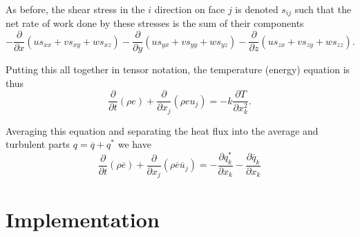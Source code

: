 As before, the shear stress in the $i$ direction on face $j$ is denoted $s_{ij}$ such that the net rate of work done by these stresses is the sum of their components
\begin{equation} - \frac{\partial }{\partial x} \left ( u s_{xx} + v s_{xy} + w s_{xz} \right) - \frac{\partial }{\partial y} \left (u s_{yx} + v s_{yy} + w s_{yz} \right) - \frac{\partial }{\partial z}\left (u s_{zx} + v s_{zy} + w s_{zz} \right) \label{eq:energy6}.\end{equation}

Putting this all together in tensor notation, the temperature (energy) equation is thus
\begin{equation} \frac{\partial }{\partial t} \left ( \rho e\right ) + \frac{\partial}{\partial x_j} \left ( \rho e u_j \right ) 
= 
-k \frac{\partial T}{\partial x_k^2}.
\end{equation}

Averaging this equation and separating the heat flux into the average and turbulent parts $q = \overline{q} + q^*$ we have
\begin{equation} \frac{\partial }{\partial t} \left ( \rho \overline{e}\right ) + \frac{\partial}{\partial x_j} \left ( \rho \overline{e} \overline{u}_j \right ) 
= 
- \frac{\partial q_k^*}{\partial x_k}
- \frac{\partial \overline{q}_k}{\partial x_k}
\end{equation}

\section{Implementation}

